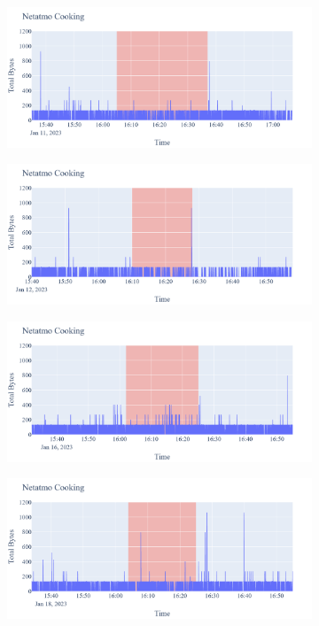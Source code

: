 \begin{figure}[H]
\begin{subfigure}[b]{0.47\textwidth}
        \centering
        \includegraphics[width=1.2\hsize]{figures/Netatmo_Cooking_Bytes_11.01.png}
    \end{subfigure}
    \begin{subfigure}[b]{0.47\textwidth}
        \centering
        \includegraphics[width=1.2\hsize]{figures/Netatmo_Cooking_Bytes_12.01.png}
    \end{subfigure}
    \begin{subfigure}[b]{0.47\textwidth}
        \centering
        \includegraphics[width=1.2\hsize]{figures/Netatmo_Cooking_Bytes_16.01.png}
    \end{subfigure}
    \begin{subfigure}[b]{0.47\textwidth}
        \centering
        \includegraphics[width=1.2\hsize]{figures/Netatmo_Cooking_Bytes_18.01.png}

\end{subfigure}
\end{figure}
